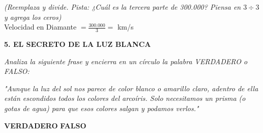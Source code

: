 \documentclass[12pt, letterpaper]{article}
\newcommand{\boxfill}[1][2.5cm]{\tcbox[on line, size=minimal, colframe=valdark!80, colback=white, boxrule=0.5pt, arc=1mm, boxsep=3pt, left=2pt, right=2pt, top=2pt, bottom=2pt]{\hspace*{#1}\vphantom{M}}}
\begin{document}
\vspace{0.4cm}
\begin{center}
    \textit{(Reemplaza y divide. Pista: ¿Cuál es la tercera parte de 300.000? Piensa en $3 \div 3$ y agrega los ceros)}\\[0.5cm]
    
    \Large 
    Velocidad en Diamante $= \frac{300.000}{3} =$ \boxfill[3cm] km/s
\end{center}

\vspace{0.8cm}

\noindent \textbf{\textcolor{valblue}{5. EL SECRETO DE LA LUZ BLANCA}}

\vspace{0.2cm}
\noindent \textit{Analiza la siguiente frase y encierra en un círculo la palabra VERDADERO o FALSO:}

\vspace{0.4cm}
\begin{center}
    \begin{tcolorbox}[colback=white, colframe=valdark, boxrule=0.5pt, width=13cm, arc=2mm]
        \textit{"Aunque la luz del sol nos parece de color blanco o amarillo claro, adentro de ella están escondidos todos los colores del arcoíris. Solo necesitamos un prisma (o gotas de agua) para que esos colores salgan y podamos verlos."}
    \end{tcolorbox}
\end{center}

\vspace{0.6cm}
\begin{center}
    \Large
    \textbf{VERDADERO} \hspace{3cm} \textbf{FALSO}
\end{center}

\vspace{1.5cm}
\end{document}
